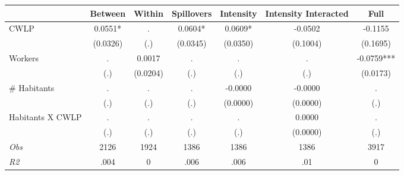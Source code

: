 \begin{tabular}{l*{6}{c}}\hline&\multicolumn{1}{c}{Between}&\multicolumn{1}{c}{Within}&\multicolumn{1}{c}{Spillovers}&\multicolumn{1}{c}{Intensity}&\multicolumn{1}{c}{Intensity Interacted}&\multicolumn{1}{c}{Full}\\ \hline 
CWLP & 0.0551* & . & 0.0604* & 0.0609* & -0.0502 & -0.1155 \\
 & (0.0326) & (.) & (0.0345) & (0.0350) & (0.1004) & (0.1695) \\
Workers & . & 0.0017 & . & . & . & -0.0759*** \\
 & (.) & (0.0204) & (.) & (.) & (.) & (0.0173) \\
\# Habitants & . & . & . & -0.0000 & -0.0000 & . \\
 & (.) & (.) & (.) & (0.0000) & (0.0000) & (.) \\
Habitants X CWLP & . & . & . & . & 0.0000 & . \\
 & (.) & (.) & (.) & (.) & (0.0000) & (.) \\
\hline \textit{Obs} & 2126 & 1924 & 1386 & 1386 & 1386 & 3917 \\ \textit{R2} & .004 & 0 & .006 & .006 & .01 & 0 \\ \hline \end{tabular}
